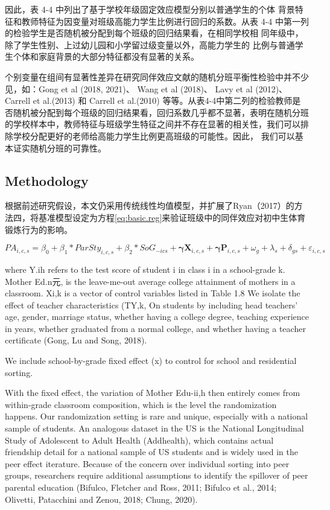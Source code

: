 因此，表 4-4 中列出了基于学校年级固定效应模型分别以普通学生的个体 背景特征和教师特征为因变量对班级高能力学生比例进行回归的系数。从表 4-4 中第一列的检验学生是否随机被分配到每个班级的回归结果看，在相同学校相 同年级中，除了学生性别、上过幼儿园和小学留过级变量以外，高能力学生的 比例与普通学生个体和家庭背景的大部分特征都没有显著的关系。

个别变量在组间有显著性差异在研究同伴效应文献的随机分班平衡性检验中并不少见，如：Gong et al (2018, 2021)、 Wang et al (2018)、 Lavy et al (2012)、 Carrell et al.(2013) 和 Carrell et al.(2010) 等等。从表4-4中第二列的检验教师是否随机被分配到每个班级的回归结果看，回归系数几乎都不显著，表明在随机分班的学校样本中，教师特征与班级学生特征之间并不存在显著的相关性，我们可以排除学校分配更好的老师给高能力学生比例更高班级的可能性。因此， 我们可以基本证实随机分班的可靠性。

\subsection{Methodology}

根据前述研究假设，本文仍采用传统线性均值模型，并扩展了Ryan（2017）的方法四，将基准模型设定为方程\eqref{eq:basic.reg}来验证班级中的同伴效应对初中生体育锻炼行为的影响。

\begin{equation}
PA_{i,c,s} =\beta_0 + \beta_1 * {ParSty}_{i,c,s}+\beta_2 * {SoG}_{-ics} + \boldsymbol{\gamma} \boldsymbol{X}_{i,c,s} +\boldsymbol{\gamma}\boldsymbol{P}_{i,c,s}+ \omega_g+\lambda_s+\delta_{gs}+\varepsilon_{i,c,s}
\label{eq:basic.reg}
\end{equation}

where Y.ih refers to the test score of student i in class i in a school-grade k. Mother Ed.n元, is the leave-me-out average college attainment of mothers in a classroom. Xi,k is a vector of control variables listed in Table 1.8 We isolate the effect of teacher characteristics (TY,k, On students by including head teachers’ age, gender, marriage status, whether having a college degree, teaching experience in years, whether graduated from a normal college, and whether having a teacher certificate (Gong, Lu and Song, 2018).

We include school-by-grade fixed effect (x) to control for school and residential sorting.

With the fixed effect, the variation of Mother Edu-ii,h then entirely comes from within-grade classroom composition, which is the level the randomization happens. Our randomization setting is rare and unique, especially with a national sample of students. An analogous dataset in the US is the National Longitudinal Study of Adolescent to Adult Health (Addhealth), which contains actual friendship detail for a national sample of US students and is widely used in the peer effect iterature. Because of the concern over individual sorting into peer groups, researchers require additional assumptions to identify the spillover of peer parental education (Bifulco, Fletcher and Ross, 2011; Bifulco et al., 2014; Olivetti, Patacchini and Zenou, 2018; Chung, 2020).

